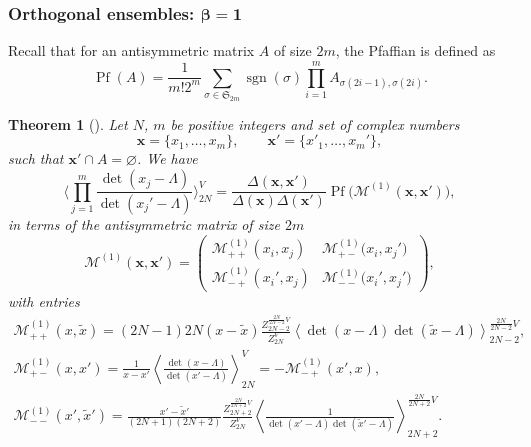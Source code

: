 \documentclass[pdftex]{sigma}
\numberwithin{equation}{section}
\newtheorem{Theorem}{Theorem}[section]
\newcommand{\mean}[1]{\left\langle{#1}\right\rangle}
\DeclareMathOperator{\pf}{Pf}
\begin{document}
\subsubsection[Orthogonal ensembles: beta = 1]{Orthogonal ensembles: $\boldsymbol{\beta = 1}$}

Recall that for an antisymmetric matrix $A$ of size $2m$, the Pfaffian is defined as
\[
\pf(A) = \frac{1}{m! 2^m} \sum_{\sigma \in \mathfrak{S}_{2m}} \operatorname{sgn}(\sigma) \prod_{i = 1}^{m} A_{\sigma(2i - 1),\sigma(2i)}.
\]

\begin{Theorem}[{\cite[Theorem 1.2.1]{borodin_averages}}]
 \label{th:idbeta1} Let $N$, $m$ be positive integers and set of complex numbers
\[
\bm{x} = \{x_{1}, \ldots, x_{m}\},\qquad \bm{x}' = \{x'_{1}, \ldots,x_{m}'\},
\]
such that $\bm{x}' \cap A = \varnothing$. We have
 \begin{equation*}%
 \Biggl\langle\prod_{j=1}^{m}\frac{\det(x_{j} - \Lambda)}{{\det} (x_{j}' - \Lambda)}\Biggr\rangle_{2N}^{V}
 = \frac{\Delta(\bm{x},\bm{x}')}{\Delta(\bm{x})\Delta(\bm{x}')}\pf\bigl(\mathcal{M}^{(1)}(\bm{x},\bm{x}')\bigr),
 \end{equation*}
 in terms of the antisymmetric matrix of size $2m$
 \begin{equation}
 \label{blockm1}
 \mathcal{M}^{(1)}(\bm{x},\bm{x}') = \begin{pmatrix} \mathcal{M}^{(1)}_{++}(x_i,x_j) & \mathcal{M}^{(1)}_{+-}\big(x_i,x_j'\big) \\ \mathcal{M}^{(1)}_{-+}(x_i',x_j) & \mathcal{M}^{(1)}_{--}\big(x_i',x_j'\big) \end{pmatrix},
\end{equation}
 with entries
 \begin{gather*}%
 \mathcal{M}^{(1)}_{++}(x,\tilde{x}) = (2N -1)2N(x - \tilde{x})\frac{Z^{\frac{2N}{2N-2}V}_{2N-2}}{Z^{V}_{2N}}\mean{\det(x - \Lambda)\det(\tilde{x}- \Lambda)}^{\frac{2N}{2N - 2}V}_{2N-2},\\
 \mathcal{M}^{(1)}_{+-}(x,x') = \frac{1}{x-x'}\mean{\frac{\det(x - \Lambda)}{\det(x' - \Lambda)}}^{V}_{2N} = - \mathcal{M}^{(1)}_{-+}(x',x), \\
 \mathcal{M}_{--}^{(1)}(x',\tilde{x}') = \frac{x'- \tilde{x}'}{(2N+1)(2N+2)}\frac{Z^{\frac{2N}{2N + 2}V}_{2N+2}}{Z^{V}_{2N}} \mean{\frac{1}{\det(x' - \Lambda)\det(\tilde{x}' - \Lambda)}}^{\frac{2N}{2N+2}V}_{2N+2}.
 \end{gather*}
\end{Theorem}
\end{document}
